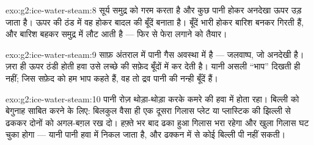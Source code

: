 \begin{solution}{exo:g2:ice-water-steam:8}
सूर्य समुद्र को गरम करता है और कुछ पानी  होकर अनदेखा ऊपर उड़
जाता है। ऊपर की ठंड में वह  होकर बादल की बूँदें बनाता है।
बूँदें भारी होकर बारिश बनकर गिरती हैं, और बारिश बहकर समुद्र में लौट
आती है --- फिर से फेरा लगाने को तैयार।
\end{solution}

\begin{solution}{exo:g2:ice-water-steam:9}
साफ़ अंतराल में पानी गैस अवस्था में है --- जलवाष्प, जो अनदेखी है।
ज़रा ही ऊपर ठंडी होती हवा उसे लच्छे की सफ़ेद बूँदों में  कर
देती है। यानी असली ``भाप'' दिखती ही नहीं; जिस सफ़ेद को हम भाप कहते
हैं, वह तो द्रव पानी की नन्ही बूँदें हैं।
\end{solution}

\begin{solution}{exo:g2:ice-water-steam:10}
पानी रोज़ थोड़ा-थोड़ा करके कमरे की हवा में  होता रहा। बिल्ली
को बेगुनाह साबित करने के लिए: बिलकुल वैसा ही एक दूसरा गिलास प्लेट या
प्लास्टिक की झिल्ली से ढककर दोनों को अगल-बग़ल रख दो। हफ़्ते भर बाद
ढका हुआ गिलास भरा रहेगा और खुला गिलास घट चुका होगा --- यानी पानी हवा
में निकल जाता है, और ढक्कन में से कोई बिल्ली पी नहीं सकती।
\end{solution}
